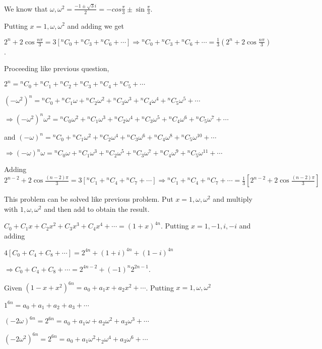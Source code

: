   We know that $\omega, \omega^2 = \frac{-1\pm\sqrt{3}i}{2} = -cos\frac{\pi}{3} \pm \sin\frac{\pi}{3}$.

  Putting $x = 1, \omega, \omega^2$ and adding we get

  $2^n + 2\cos\frac{n\pi}{3} = 3[{}^nC_0 + {}^nC_3 + {}^nC_6 + \cdots] \Rightarrow {}^nC_0 + {}^nC_3 +
  {}^nC_6 + \cdots = \frac{1}{3}\left(2^n + 2\cos\frac{n\pi}{3}\right)$.
\item Proceeding like previous question,

  $2^n = {}^nC_0 + {}^nC_1 + {}^nC_2 + {}^nC_3 + {}^nC_4 + {}^nC_5 + \cdots$

  $(-\omega^2)^n = {}^nC_0 + {}^nC_1\omega + {}^nC_2\omega^2 + {}^nC_3\omega^3 + {}^nC_4\omega^4 +
  {}^nC_5\omega^5 + \cdots$

  $\Rightarrow (-\omega^2)^{n}\omega^2 = {}^nC_0\omega^2 + {}^nC_1\omega^3 + {}^nC_2\omega^4 + {}^nC_3\omega^5 + {}^nC_4\omega^6 +
  {}^nC_5\omega^7 + \cdots$

  and $(-\omega)^n = {}^nC_0 + {}^nC_1\omega^2 + {}^nC_2\omega^4 + {}^nC_3\omega^6 + {}^nC_4\omega^8 +
  {}^nC_5\omega^{10} + \cdots$

  $\Rightarrow (-\omega)^n\omega = {}^nC_0\omega + {}^nC_1\omega^3 + {}^nC_2\omega^5 + {}^nC_3\omega^7 + {}^nC_4\omega^9 +
  {}^nC_5\omega^{11} + \cdots$

  Adding $2^{n - 2} + 2\cos\frac{(n- 2)\pi}{3} = 3[{}^nC_1 + {}^nC_4 + {}^nC_7 + \cdots] \Rightarrow {}^nC_1
  + {}^nC_4 + {}^nC_7 + \cdots = \frac{1}{3}\left[2^{n - 2} + 2\cos\frac{(n - 2)\pi}{3}\right]$
\item This problem can be solved like previous problem. Put $x = 1, \omega, \omega^2$ and multiply with $1,
  \omega, \omega^2$ and then add to obtain the result.
\item $C_0 + C_1x + C_2x^2 + C_3x^3 + C_4x^4 + \cdots = (1 + x)^{4n}$. Putting $x = 1, -1, i, -i$ and adding

  $4[C_0 + C_4 + C_8 + \cdots] = 2^{4n} + (1 + i)^{4n} + (1 - i)^{4n}$

  $\Rightarrow C_0 + C_4 + C_8 + \cdots = 2^{4n - 2} + (-1)^n2^{2n - 1}$.
\item Given $(1 - x + x^2)^{6n} = a_0 + a_1x + a_2x^2 + \cdots$. Putting $x = 1, \omega, \omega^2$

  $1^{6n} = a_0 + a_1 + a_2 + a_3 + \cdots$

  $(-2\omega)^{6n}= 2^{6n} = a_0 + a_1\omega + a_2\omega^2 + a_3\omega^3 + \cdots$

  $(-2\omega^2)^{6n}= 2^{6n} = a_0 + a_1\omega^2 + _2\omega^4 + a_3\omega^6 + \cdots$

